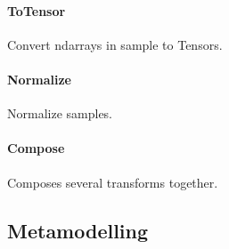 \documentclass[letterpaper,10pt,english]{sphinxmanual}
\begin{document}
\paragraph{ToTensor}
\label{\detokenize{api/transforms:totensor}}

\begin{fulllineitems}
\label{\detokenize{api/transforms:geology.datasets.ToTensor}}
Convert ndarrays in sample to Tensors.

\end{fulllineitems}



\paragraph{Normalize}
\label{\detokenize{api/transforms:normalize}}

\begin{fulllineitems}
\label{\detokenize{api/transforms:geology.datasets.Normalize}}
Normalize samples.

\end{fulllineitems}



\paragraph{Compose}
\label{\detokenize{api/transforms:compose}}

\begin{fulllineitems}
\label{\detokenize{api/transforms:geology.datasets.Compose}}
Composes several transforms together.

\end{fulllineitems}



\subsection{Metamodelling}
\label{\detokenize{api/metamodelling:metamodelling}}\label{\detokenize{api/metamodelling::doc}}
\end{document}
